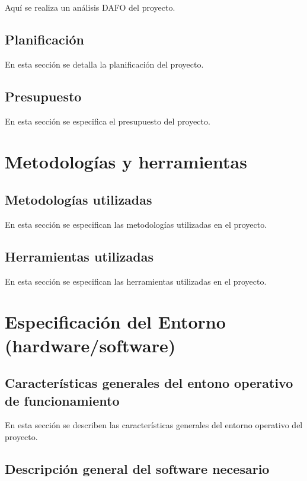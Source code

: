 Aquí se realiza un análisis DAFO del proyecto.

\subsection{\textbf{Planificación}}

En esta sección se detalla la planificación del proyecto.

\subsection{\textbf{Presupuesto}}

En esta sección se especifica el presupuesto del proyecto.

\section{\textbf{Metodologías y herramientas}}

\subsection{\textbf{Metodologías utilizadas}}

En esta sección se especifican las metodologías utilizadas en el proyecto.

\subsection{\textbf{Herramientas utilizadas}}

En esta sección se especifican las herramientas utilizadas en el proyecto.

\section{\textbf{Especificación del Entorno (hardware/software)}}

\subsection{\textbf{Características generales del entono operativo de funcionamiento}}

En esta sección se describen las características generales del entorno operativo del proyecto.

\subsection{\textbf{Descripción general del software necesario}}

